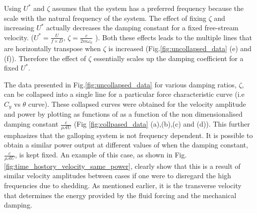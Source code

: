 
 Using $U^*$ and $\zeta$ assumes that the system has a preferred frequency because the scale with the natural frequency of the system. The effect of fixing $\zeta$ and increasing $U^*$ actually decreases the damping constant for a fixed free-stream velocity. ($U^*=\frac{U}{f \times D}$, $\zeta= \frac{c}{2 m \omega_n}$ ). Both these effects leads to the multiple lines that are horizontally transpose when $\zeta$ is increased (Fig.\ref{fig:uncollapsed_data} (e) and (f)). Therefore the effect of $\zeta$ essentially scales up the damping coefficient for a fixed $U^*$.
 
 The data presented in Fig.\ref{fig:uncollapsed_data} for various damping ratios, $\zeta$, can be collapsed into a single line for a particular force characteristic curve (i.e $C_y$ vs $\theta$ curve). These collapsed curves were  obtained for the velocity amplitude  and power by plotting as functions of as a function of  the non dimensionalised  damping constant $\frac{c}{\rho\mathcal{A}U}$ 
(Fig \ref{fig:collpased_data} (a),(b),(c) and (d)).  This further emphasizes that the galloping system is not frequency dependent. It is possible to obtain a similar power output at different values of \ustar when the damping constant, $\frac{c}{\rho\mathcal{A}U}$, is kept fixed. An example of this case, as shown in Fig.\ref{fig:time_hostory_velocity_same_power}, clearly show that this is a result of similar velocity amplitudes between cases if one were to disregard the high frequencies due to shedding. As mentioned earlier, it is the transverse velocity that determines the energy provided by the fluid forcing and the mechanical damping.


 



